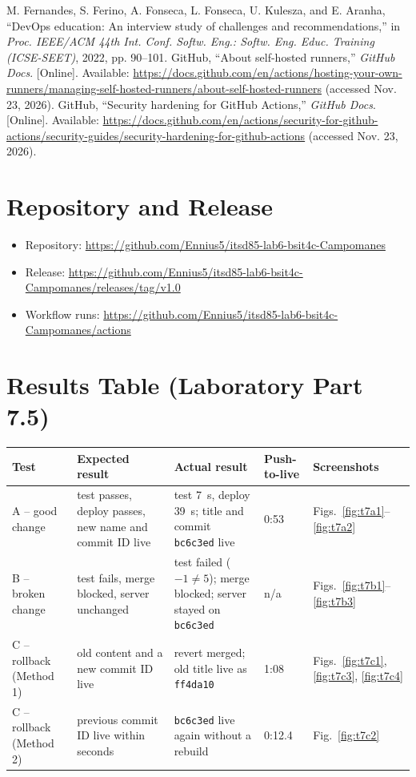 \documentclass[conference]{IEEEtran}
\begin{document}
\begin{thebibliography}{00}
 M. Fernandes, S. Ferino, A. Fonseca, L. Fonseca, U. Kulesza, and E. Aranha, ``DevOps education: An interview study of challenges and recommendations,'' in \textit{Proc. IEEE/ACM 44th Int. Conf. Softw. Eng.: Softw. Eng. Educ. Training (ICSE-SEET)}, 2022, pp. 90--101.
 GitHub, ``About self-hosted runners,'' \textit{GitHub Docs}. [Online]. Available: \url{https://docs.github.com/en/actions/hosting-your-own-runners/managing-self-hosted-runners/about-self-hosted-runners} (accessed Nov. 23, 2026).
 GitHub, ``Security hardening for GitHub Actions,'' \textit{GitHub Docs}. [Online]. Available: \url{https://docs.github.com/en/actions/security-for-github-actions/security-guides/security-hardening-for-github-actions} (accessed Nov. 23, 2026).
\end{thebibliography}

\clearpage
\onecolumn
\appendices
\section{Repository and Release}
\begin{itemize}
\item Repository: \url{https://github.com/Ennius5/itsd85-lab6-bsit4c-Campomanes}
\item Release: \url{https://github.com/Ennius5/itsd85-lab6-bsit4c-Campomanes/releases/tag/v1.0}
\item Workflow runs: \url{https://github.com/Ennius5/itsd85-lab6-bsit4c-Campomanes/actions}
\end{itemize}

\section{Results Table (Laboratory Part 7.5)}
\begin{center}
\small
\begin{tabular}{@{}L{2.6cm}L{4.4cm}L{4.6cm}L{1.6cm}L{3.2cm}@{}}
\toprule
\textbf{Test} & \textbf{Expected result} & \textbf{Actual result} & \textbf{Push-to-live} & \textbf{Screenshots}\\
\midrule
A -- good change & test passes, deploy passes, new name and commit ID live & test 7~s, deploy 39~s; title and commit \texttt{bc6c3ed} live & 0:53 & Figs.~\ref{fig:t7a1}--\ref{fig:t7a2}\\
B -- broken change & test fails, merge blocked, server unchanged & test failed ($-1 \neq 5$); merge blocked; server stayed on \texttt{bc6c3ed} & n/a & Figs.~\ref{fig:t7b1}--\ref{fig:t7b3}\\
C -- rollback (Method 1) & old content and a new commit ID live & revert merged; old title live as \texttt{ff4da10} & 1:08 & Figs.~\ref{fig:t7c1}, \ref{fig:t7c3}, \ref{fig:t7c4}\\
C -- rollback (Method 2) & previous commit ID live within seconds & \texttt{bc6c3ed} live again without a rebuild & 0:12.4 & Fig.~\ref{fig:t7c2}\\
\bottomrule
\end{tabular}
\end{center}
\end{document}

